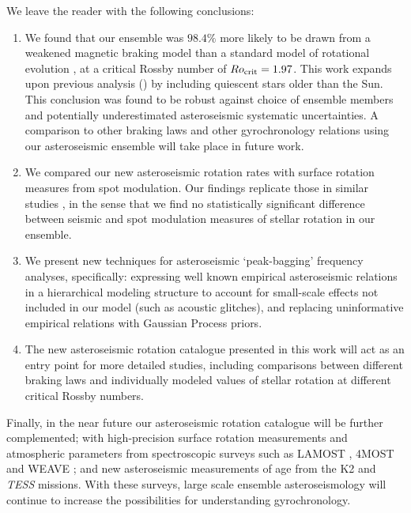 \documentclass[12pt]{article}
\newcommand{\tess}{\emph{TESS}\xspace}
\newcommand{\ktwo}{K2\xspace}
\begin{document}
We leave the reader with the following conclusions:
\begin{enumerate}
	\item We found that our ensemble was $98.4\%$ more likely to be drawn from a weakened magnetic braking model than a standard model of rotational evolution \cite{vansaders+pinsonneault2013}, at a critical Rossby number of $Ro_{\rm{crit}} = 1.97$. This work expands upon previous analysis (\cite{vansaders+2019}) by including quiescent stars older than the Sun. This conclusion was found to be robust against choice of ensemble members and potentially underestimated asteroseismic systematic uncertainties. A comparison to other braking laws \cite{matt+2015} and other gyrochronology relations using our asteroseismic ensemble will take place in future work.
	
	\item We compared our new asteroseismic rotation rates with surface rotation measures from spot modulation. Our findings replicate those in similar studies \cite{nielsen+2015,benomar+2015}, in the sense that we find no statistically significant difference between seismic and spot modulation measures of stellar rotation in our ensemble.
	
	\item We present new techniques for asteroseismic `peak-bagging' frequency analyses, specifically: expressing well known empirical asteroseismic relations in a hierarchical modeling structure to account for small-scale effects not included in our model (such as acoustic glitches), and replacing uninformative empirical relations with Gaussian Process priors.
	
	\item The new asteroseismic rotation catalogue presented in this work will act as an entry point for more detailed studies, including comparisons between different braking laws and individually modeled values of stellar rotation at different critical Rossby numbers.
\end{enumerate}

Finally, in the near future our asteroseismic rotation catalogue will be further complemented; with high-precision surface rotation measurements and atmospheric parameters from spectroscopic surveys such as LAMOST \cite{deng+2012}, 4MOST \cite{dejong+2014} and WEAVE \cite{dalton+2014}; and new asteroseismic measurements of age from the \ktwo and \tess missions. With these surveys, large scale ensemble asteroseismology will continue to increase the possibilities for understanding gyrochronology.\\
\end{document}
